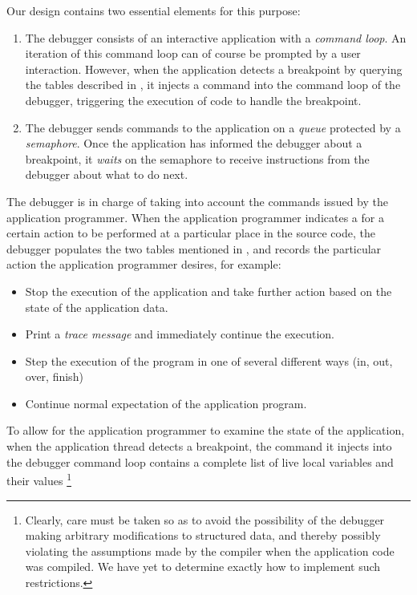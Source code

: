 Our design contains two essential elements for this purpose:

\begin{enumerate}
\item The debugger consists of an interactive application with a
  \emph{command loop}.  An iteration of this command loop can of
  course be prompted by a user interaction.  However, when the
  application detects a breakpoint by querying the tables described in
  , it injects a command into the
  command loop of the debugger, triggering the execution of code to
  handle the breakpoint.
\item The debugger sends commands to the application on a \emph{queue}
  protected by a \emph{semaphore}.  Once the application has informed
  the debugger about a breakpoint, it \emph{waits} on the semaphore to
  receive instructions from the debugger about what to do next.
\end{enumerate}

The debugger is in charge of taking into account the commands issued
by the application programmer.  When the application programmer
indicates a for a certain action to be performed at a particular place
in the source code, the debugger populates the two tables mentioned in
, and records the particular action the
application programmer desires, for example:

\begin{itemize}
\item Stop the execution of the application and take further action
  based on the state of the application data.
\item Print a \emph{trace message} and immediately continue the
  execution.
\item Step the execution of the program in one of several different
  ways (in, out, over, finish)
\item Continue normal expectation of the application program.
\end{itemize}

To allow for the application programmer to examine the state of the
application, when the application thread detects a breakpoint, the
command it injects into the debugger command loop contains a complete
list of live local variables and their values%
\footnote{Clearly, care must be taken so as to avoid the possibility
  of the debugger making arbitrary modifications to structured data,
  and thereby possibly violating the assumptions made by the compiler
  when the application code was compiled.  We have yet to determine
  exactly how to implement such restrictions.}

